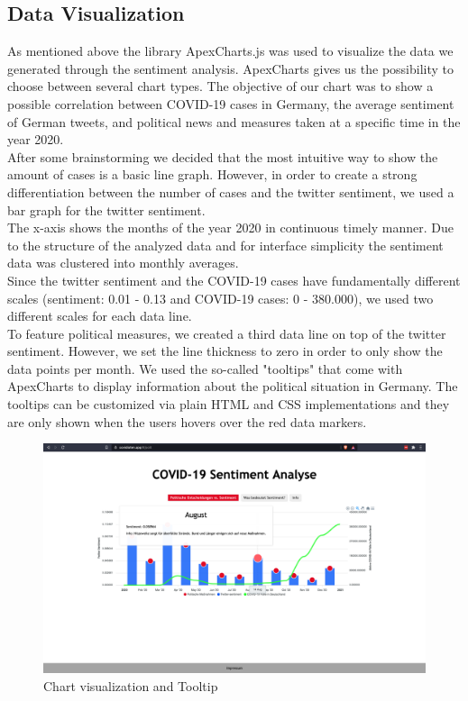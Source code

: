 \documentclass[
    fontsize=12pt,
    headings=small,
    parskip=half,           %
    bibliography=totoc,
    numbers=noenddot,       %
    open=any,               %
    ]{scrreprt}
\begin{document}
\subsection{Data Visualization}
As mentioned above the library ApexCharts.js was used to visualize the data we generated through the sentiment analysis. ApexCharts gives us the possibility to choose between several chart types. The objective of our chart was to show a possible correlation between COVID-19 cases in Germany, the average sentiment of German tweets, and political news and measures taken at a specific time in the year 2020. \\
After some brainstorming we decided that the most intuitive way to show the amount of cases is a basic line graph. However, in order to create a strong differentiation between the number of cases and the twitter sentiment, we used a bar graph for the twitter sentiment. \\
The x-axis shows the months of the year 2020 in continuous timely manner. Due to the structure of the analyzed data and for interface simplicity the sentiment data was clustered into monthly averages.\\
Since the twitter sentiment and the COVID-19 cases have fundamentally different scales (sentiment: 0.01 - 0.13 and COVID-19 cases: 0 - 380.000), we used two different scales for each data line. \\
To feature political measures, we created a third data line on top of the twitter sentiment. However, we set the line thickness to zero in order to only show the data points per month. We used the so-called "tooltips" that come with ApexCharts to display information about the political situation in Germany. The tooltips can be customized via plain HTML and CSS implementations and they are only shown when the users hovers over the red data markers. 

\begin{figure}[h]
    \centering
    \includegraphics[width=1.0\textwidth]{pic/Tooltips.png}
    \caption{Chart visualization and Tooltip}
    \label{fig:my_label}
\end{figure}
\end{document}
